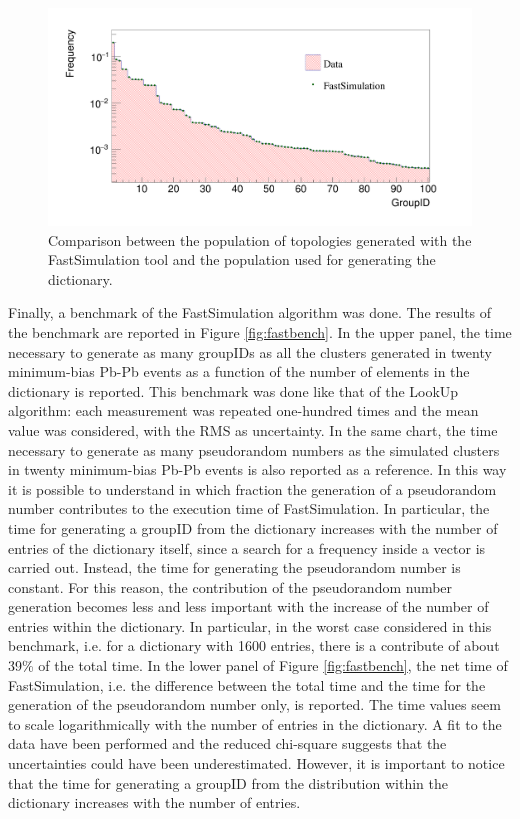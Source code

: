 \begin{figure}
  \centering
  \includegraphics[scale=0.2]{figures/fastcomp.png}
  \caption{Comparison between the population of topologies generated with the FastSimulation tool and the population used for generating the dictionary.}
  \label{fig:fastcomp}
\end{figure}
%
Finally, a benchmark of the FastSimulation algorithm was done. The results of the benchmark are reported in Figure \ref{fig:fastbench}. In the upper panel, the time necessary to generate as many groupIDs as all the clusters generated in twenty minimum-bias Pb-Pb events as a function of the number of elements in the dictionary is reported. This benchmark was done like that of the LookUp algorithm: each measurement was repeated one-hundred times and the mean value was considered, with the RMS as uncertainty. In the same chart, the time necessary to generate as many pseudorandom numbers as the simulated clusters in twenty minimum-bias Pb-Pb events is also reported as a reference. In this way it is possible to understand in which fraction the generation of a pseudorandom number contributes to the execution time of FastSimulation. In particular, the time for generating a groupID from the dictionary increases with the number of entries of the dictionary itself, since a search for a frequency inside a vector is carried out. Instead, the time for generating the pseudorandom number is constant. For this reason, the contribution of the pseudorandom number generation becomes less and less important with the increase of the number of entries within the dictionary. In particular, in the worst case considered in this benchmark, i.e. for a dictionary with 1600 entries, there is a contribute of about 39\% of the total time. In the lower panel of Figure \ref{fig:fastbench}, the net time of FastSimulation, i.e. the difference between the total time and the time for the generation of the pseudorandom number only, is reported. The time values seem to scale logarithmically with the number of entries in the dictionary. A fit to the data have been performed and the reduced chi-square suggests that the uncertainties could have been underestimated. However, it is important to notice that the time for generating a groupID from the distribution within the dictionary increases with the number of entries.
